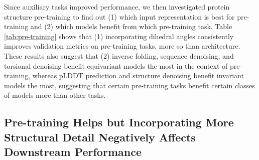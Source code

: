Since auxiliary tasks improved performance, we then investigated protein structure pre-training to find out (1) which input representation is best for pre-training and (2) which models benefit from which pre-training task. Table \ref{tab:pre-training} shows that (1) incorporating dihedral angles consistently improves validation metrics on pre-training tasks, more so than architecture. These results also suggest that (2) inverse folding, sequence denoising, and torsional denoising benefit equivariant models the most in the context of pre-training, whereas pLDDT prediction and structure denoising benefit invariant models the most, suggesting that certain pre-training tasks benefit certain classes of models more than other tasks.

\subsection{Pre-training Helps but Incorporating More Structural Detail Negatively Affects Downstream Performance}

